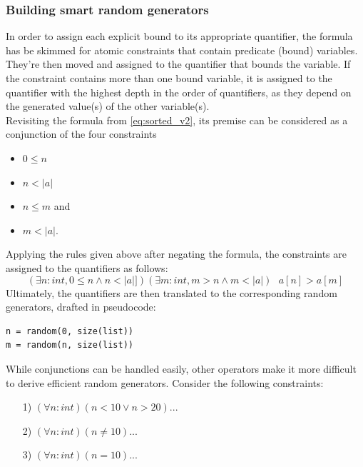 \subsubsection{Building smart random generators}
In order to assign each explicit bound to its appropriate quantifier, the formula has be skimmed for atomic constraints that contain predicate (bound) variables. They're then moved and assigned to the quantifier that bounds the variable. If the constraint contains more than one bound variable, it is assigned to the quantifier with the highest depth in the order of quantifiers, as they depend on the generated value(s) of the other variable(s). \\
Revisiting the formula from \eqref{eq:sorted_v2}, its premise can be considered as a conjunction of the four constraints
\begin{itemize}
\itemsep-1em
\item $0 \leq n$
\item $n < |a| $
\item $n \le m$ and
\item $m < |a|$.
\end{itemize}
Applying the rules given above after negating the formula, the constraints are assigned to the quantifiers as follows:
\begin{equation}\label{eq:sorted_v2_bounds}
	(\exists n : int, 0 \leq n \wedge n < |a|])(\exists m : int, m > n \wedge m < |a|) \text{ } a[n] > a[m]
\end{equation}
Ultimately, the quantifiers are then translated to the corresponding random generators, drafted in pseudocode:
\begin{lstlisting}[label=lst:rand, numbers=none]
n = random(0, size(list))
m = random(n, size(list))
\end{lstlisting}
While conjunctions can be handled easily, other operators make it more difficult to derive efficient random generators. Consider the following constraints:
\begin{itemize}
\itemsep-0.7em
\item[1)] $(\forall n : int) (n < 10 \lor n > 20) ...$
\item[2)] $(\forall n : int) (n \ne 10) ...$
\item[3)] $(\forall n : int) (n = 10) ...$
\end{itemize}
